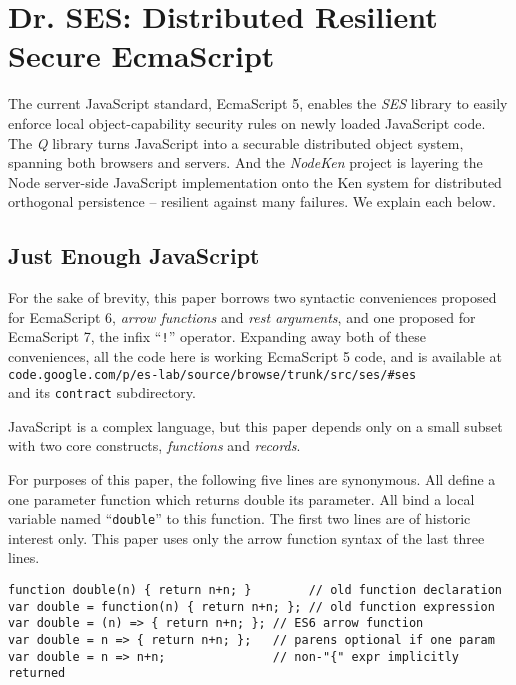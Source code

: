 \documentclass{llncs}
\begin{document}
\section{Dr. SES: Distributed Resilient Secure EcmaScript}

The current JavaScript standard, EcmaScript 5, enables the \emph{SES} library to easily enforce local object-capability security rules on newly loaded JavaScript code. The \emph{Q} library turns JavaScript into a securable distributed object system, spanning both browsers and servers. And the \emph{NodeKen} project is layering the Node server-side JavaScript implementation onto the Ken system for distributed orthogonal persistence -- resilient against many failures. We explain each below.

\subsection{Just Enough JavaScript}

For the sake of brevity, this paper borrows two syntactic conveniences proposed for EcmaScript 6, \emph{arrow functions} and \emph{rest arguments}, and one proposed for EcmaScript 7, the infix ``{\tt !}'' operator. Expanding away both of these conveniences, all the code here is working EcmaScript 5 code, and is available at \\
{\tt code.google.com/p/es-lab/source/browse/trunk/src/ses/\#ses} \\
and its {\tt contract} subdirectory.

JavaScript is a complex language, but this paper depends only on a small subset with two core constructs, \emph{functions} and \emph{records}. 

For purposes of this paper, the following five lines are synonymous. All define a one parameter function which returns double its parameter. All bind a local variable named ``{\tt double}'' to this function. The first two lines are of historic interest only. This paper uses only the arrow function syntax of the last three lines.

\begin{verbatim}
function double(n) { return n+n; }        // old function declaration
var double = function(n) { return n+n; }; // old function expression
var double = (n) => { return n+n; }; // ES6 arrow function
var double = n => { return n+n; };   // parens optional if one param
var double = n => n+n;               // non-"{" expr implicitly returned
\end{verbatim}
\end{document}
